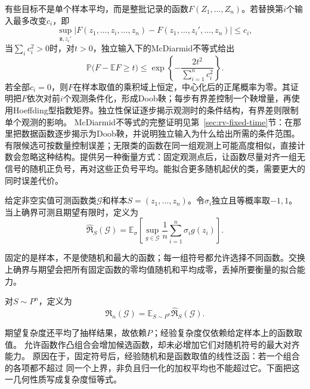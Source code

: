 有些目标不是单个样本平均，而是整批记录的函数\(F(Z_1,\ldots,Z_n)\)。若替换第\(i\)个输入最多改变\(c_i\)，即
\[ \sup_{\bm{z},z_i'}
  |F(z_1,\ldots,z_i,\ldots,z_n)-F(z_1,\ldots,z_i',\ldots,z_n)|\leq c_i, \]
当\(\sum_i c_i^2>0\)时，对\(t>0\)，独立输入下的McDiarmid不等式给出
\begin{equation}
  \mathbb{P}\bigl(
    F-\mathbb{E}F\geq t
  \bigr)
  \leq
  \exp\left\{
    -\frac{2t^2}{\sum_{i=1}^{n}c_i^2}
  \right\}.
  \label{eq:probability-mcdiarmid}
\end{equation}
若全部\(c_i=0\)，则\(F\)在样本取值的乘积域上恒定，中心化后的正尾概率为零。其证明把\(F\)依次对前\(i\)个观测条件化，形成Doob鞅；每步有界差控制一个鞅增量，再使用Hoeffding型指数矩界。独立性保证逐步揭示观测时的条件结构，有界差则限制单个观测的影响。
McDiarmid不等式的完整证明见第~\ref{sec:rv-fixed-time}节：在那里把数据函数逐步揭示为Doob鞅，并说明独立输入为什么给出所需的条件范围。
有限候选可按数量控制误差；无限类的函数在同一组观测上可能高度相似，直接计数会忽略这种结构。提供另一种衡量方式：固定观测点后，让函数尽量对齐一组无信号的随机正负号，再对这些正负号平均。能拟合更多随机起伏的类，需要更大的同时误差代价。
\begin{definition}[经验Rademacher复杂度]
  \label{def:rademacher-complexity}
  给定非空实值可测函数类\(\mathcal G\)和样本\(S=(z_1,\ldots,z_n)\)。令\(\sigma_i\)独立且等概率取\(-1,1\)。当上确界可测且期望有限时，定义为
  \begin{equation}
    \widehat{\mathfrak R}_S(\mathcal G)
    =\mathbb E_\sigma\left[\sup_{g\in\mathcal G}\frac1n\sum_{i=1}^n\sigma_i g(z_i)\right].
    \label{eq:empirical-rademacher}
  \end{equation}
\end{definition}
固定的是样本，不是使随机和最大的函数；每一组符号都允许选择不同函数。交换上确界与期望会把所有固定函数的零均值随机和平均成零，丢掉所要衡量的拟合能力。
\begin{definition}[期望Rademacher复杂度]
  \label{def:expected-rademacher-complexity}
  对\(S\sim P^n\)，定义为
  \[
    \mathfrak R_n(\mathcal G)=\mathbb E_{S\sim P^n}\widehat{\mathfrak R}_S(\mathcal G).
  \]
\end{definition}
期望复杂度还平均了抽样结果，故依赖\(P\)；经验复杂度仅依赖给定样本上的函数取值。
允许函数作凸组合会增加候选函数，却未必增加它们对随机符号的最大对齐能力。
原因在于，固定符号后，经验随机和是函数取值的线性泛函：若一个组合的各项都不超过
同一个上界，非负且归一化的加权平均也不能超过它。下面把这一几何性质写成复杂度恒等式。

